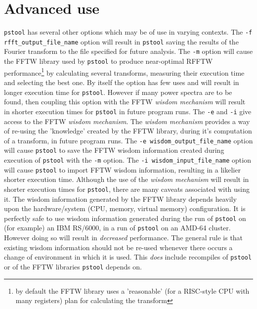 \documentclass[12pt]{article}
\begin{document}
\section{Advanced use}
\texttt{pstool} has several other options which may be of
use in varying contexts. The \texttt{-f rfft\_output\_file\_name}
option will result in 
\texttt{pstool} saving the results of the Fourier transform to the
file specified for future analysis. The \texttt{-m} option will cause
the FFTW library used by \texttt{pstool} to produce near-optimal RFFTW
performance\footnote{by default the FFTW library uses a 'reasonable'
  (for a RISC-style CPU with many registers)
  plan for calculating the transform} by calculating several
transforms, measuring their 
execution time and selecting the best one. By itself the option has
few uses and will result in longer execution time for
\texttt{pstool}. However if many power spectra are to be found, then
coupling this option with the FFTW 
\emph{wisdom mechanism} will result in shorter execution times for
\texttt{pstool} in future program runs. The \texttt{-e} and
\texttt{-i} give access to the 
FFTW \emph{wisdom mechanism}. The \emph{wisdom 
mechanism} provides a way of re-using the 'knowledge' created by the
FFTW library, during it's computation of a transform, in future
program runs. The \texttt{-e wisdom\_output\_file\_name} option will
cause \texttt{pstool} to save the FFTW wisdom information created during
execution of \texttt{pstool} with the \texttt{-m} option. The
\texttt{-i wisdom\_input\_file\_name} option will 
cause \texttt{pstool} to import FFTW wisdom information, resulting in
a likelier shorter execution time. Although the use of the
\emph{wisdom mechanism} will result in shorter execution times for
\texttt{pstool}, there are many caveats associated with using it. The
wisdom information generated by the FFTW library depends heavily upon
the hardware/system (CPU, memory, virtual memory) configuration. It is
perfectly 
safe to use wisdom information generated during the run
of \texttt{pstool} on  (for example) an IBM RS/6000, in a run of
\texttt{pstool} on an 
AMD-64 cluster. However doing so will result in \emph{decreased}
performance. The general rule is that existing wisdom information
should not be re-used whenever there occurs a change of environment in
which it is used. This \emph{does} include recompiles of
\texttt{pstool} or of the FFTW libraries \texttt{pstool} depends on. 
\end{document}
